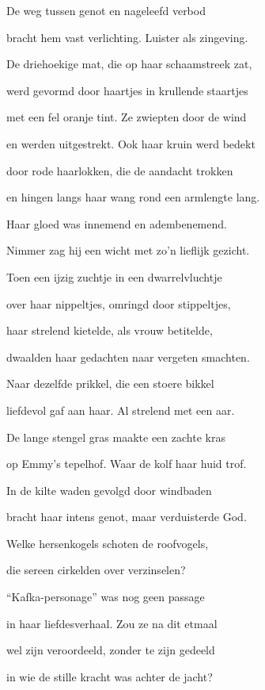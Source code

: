 De weg tussen genot
en nageleefd verbod

bracht hem vast verlichting.
Luister als zingeving.

De driehoekige mat,
die op haar schaamstreek zat,

werd gevormd door haartjes
in krullende staartjes

met een fel oranje tint.
Ze zwiepten door de wind

en werden uitgestrekt.
Ook haar kruin werd bedekt

door rode haarlokken,
die de aandacht trokken

en hingen langs haar wang
rond een armlengte lang.

Haar gloed was innemend
en adembenemend.

Nimmer zag hij een wicht
met zo’n lieflijk gezicht.

Toen een ijzig zuchtje
in een dwarrelvluchtje

over haar nippeltjes,
omringd door stippeltjes,

haar strelend kietelde,
als vrouw betitelde,

dwaalden haar gedachten
naar vergeten smachten.

Naar dezelfde prikkel,
die een stoere bikkel

liefdevol gaf aan haar.
Al strelend met een aar.

De lange stengel gras
maakte een zachte kras

op Emmy’s tepelhof.
Waar de kolf haar huid trof.

In de kilte waden
gevolgd door windbaden

bracht haar intens genot,
maar verduisterde God.

Welke hersenkogels
schoten de roofvogels,

die sereen cirkelden
over verzinselen?

“Kafka-personage”
was nog geen passage

in haar liefdesverhaal.
Zou ze na dit etmaal

wel zijn veroordeeld,
zonder te zijn gedeeld

in wie de stille kracht
was achter de jacht?
